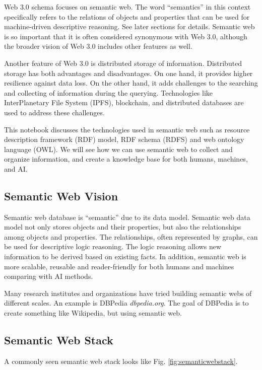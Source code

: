 Web 3.0 schema focuses on semantic web. The word ``semantics'' in this context specifically refers to the relations of objects and properties that can be used for machine-driven descriptive reasoning. See later sections for details. Semantic web is so important that it is often considered synonymous with Web 3.0, although the broader vision of Web 3.0 includes other features as well.

Another feature of Web 3.0 is distributed storage of information. Distributed storage has both advantages and disadvantages. On one hand, it provides higher resilience against data loss. On the other hand, it adds challenges to the searching and collecting of information during the querying. Technologies like InterPlanetary File System (IPFS), blockchain, and distributed databases are used to address these challenges.

This notebook discusses the technologies used in semantic web such as resource description framework (RDF) model, RDF schema (RDFS) and web ontology language (OWL). We will see how we can use semantic web to collect and organize information, and create a knowledge base for both humans, machines, and AI.

\subsection{Semantic Web Vision}

Semantic web database is ``semantic'' due to its data model. Semantic web data model not only stores objects and their properties, but also the relationships among objects and properties. The relationships, often represented by graphs, can be used for descriptive logic reasoning. The logic reasoning allows new information to be derived based on existing facts. In addition, semantic web is more scalable, reusable and reader-friendly for both humans and machines comparing with AI methods.

Many research institutes and organizations have tried building semantic webs of different scales. An example is DBPedia \textit{dbpedia.org}. The goal of DBPedia is to create something like Wikipedia, but using semantic web.

\subsection{Semantic Web Stack} \label{subsec:semanticwebstack}

A commonly seen semantic web stack looks like Fig. \ref{fig:semanticwebstack}. 

